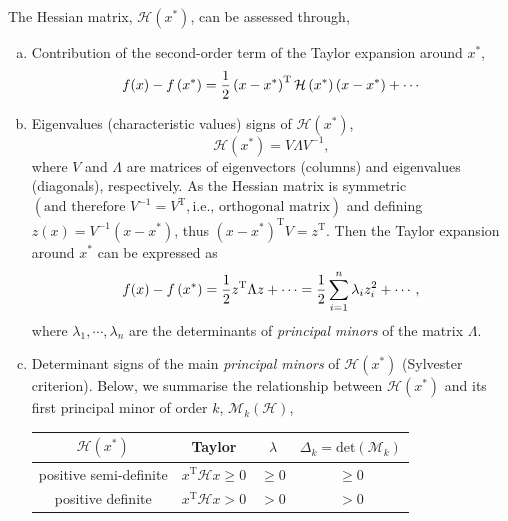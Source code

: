 The Hessian matrix, $\mathcal{H}\left(x^{\ast}\right)$, can be assessed through,
\begin{enumerate}[(a)]
   \item Contribution of the second-order term of the Taylor expansion around $x^{\ast}$,
         \begin{displaymath}
            f(x) - f\left(x^{\ast}\right) = \displaystyle\frac{1}{2}\left(x-x^{\ast}\right)^{\text{T}} \mathcal{H}\left(x^{\ast}\right)\left(x-x^{\ast}\right) + \cdots
         \end{displaymath}
   \item Eigenvalues (characteristic values) signs of $\mathcal{H}\left(x^{\ast}\right)$,
         \begin{displaymath}
            \mathcal{H}\left(x^{\ast}\right) = V \Lambda V^{-1},
         \end{displaymath}
         where $V$ and $\Lambda$ are matrices of eigenvectors (columns) and eigenvalues (diagonals), respectively. As the Hessian matrix is symmetric $\left(\text{and therefore }V^{-1}=V^{\text{T}}, \text{i.e., orthogonal matrix}\right)$ and defining $z(x)=V^{-1}\left(x-x^{\ast}\right)$, thus $\left(x-x^{\ast}\right)^{\text{T}}V=z^{\text{T}}$. Then the Taylor expansion around $x^{\ast}$ can be expressed as
         \begin{displaymath}
            f(x) - f\left(x^{\ast}\right) = \displaystyle\frac{1}{2}z^{\text{T}}\Lambda z + \cdots = \displaystyle\frac{1}{2}\sum\limits_{i=1}^{n}\lambda_{i}z_{i}^{2} + \cdots,
         \end{displaymath}
         where $\lambda_{1},\cdots,\lambda_{n}$ are the determinants of {\it principal minors} of the matrix $\Lambda$.
   \item Determinant signs of the main {\it principal minors} of $\mathcal{H}\left(x^{\ast}\right)$ (Sylvester criterion). Below,  we summarise the relationship between $\mathcal{H}\left(x^{\ast}\right)$ and its first principal minor of order $k$, $\mathcal{M}_{k}\left(\mathcal{H}\right)$,
    \begin{center}
        \begin{tabular}{|c | c c c|}
           \hline
              {\bf $\mathcal{H}\left(x^{\ast}\right)$} & {\bf Taylor}  &  {\bf $\lambda$} & {\bf $\Delta_{k}=\text{det}\left(\mathcal{M}_{k}\right)$} \\
           \hline
             positive semi-definite & $x^{\text{T}}\mathcal{H}x \ge 0$ & $\ge 0$ &   $\ge 0$ \\
             positive definite      & $x^{\text{T}}\mathcal{H}x   > 0$ & $>   0$ &   $>   0$ \\

\end{tabular}
\end{center}
\end{enumerate}

